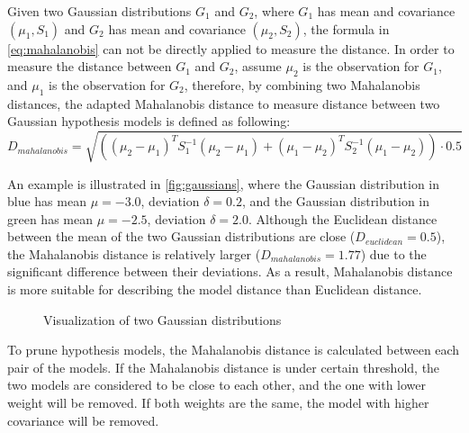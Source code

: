 Given two Gaussian distributions $G_1$ and $G_2$, where $G_1$ has mean and covariance $(\mu_1,S_1)$ and $G_2$ has mean and covariance $(\mu_2,S_2)$, the formula in \autoref{eq:mahalanobis} can not be directly applied to measure the distance.
In order to measure the distance between $G_1$ and $G_2$, assume $\mu_2$ is the observation for $G_1$, and $\mu_1$ is the observation for $G_2$, therefore, by combining two Mahalanobis distances,
the adapted Mahalanobis distance to measure distance between two Gaussian hypothesis models is defined as following:
\begin{equation}
\label{eq:mahalanobismod}
D_{mahalanobis} = \sqrt{((\mu_2 - \mu_1)^T S_1^{-1} (\mu_2-\mu_1) + (\mu_1 - \mu_2)^T S_2^{-1} (\mu_1-\mu_2)) \cdot 0.5}
\end{equation}

An example is illustrated in \autoref{fig:gaussians}, where the Gaussian distribution in blue has mean $\mu=-3.0$, deviation $\delta=0.2$, and the Gaussian distribution in green has mean $\mu=-2.5$, deviation $\delta=2.0$. Although the Euclidean distance between the mean of the two Gaussian distributions are close ($D_{euclidean}=0.5$), the Mahalanobis distance is relatively larger ($D_{mahalanobis}=1.77$) due to the significant difference between their deviations. As a result, Mahalanobis distance is more suitable for describing the model distance than Euclidean distance.


\begin{figure}[!htbp]
\begin{center}
  
\end{center}
\caption{Visualization of two Gaussian distributions}
\label{fig:gaussians}
\end{figure}


To prune hypothesis models, the Mahalanobis distance is calculated between each pair of the models. If the Mahalanobis distance is under certain threshold, the two models are considered to be close to each other, and the one with lower weight will be removed. If both weights are the same, the model with higher covariance will be removed.


